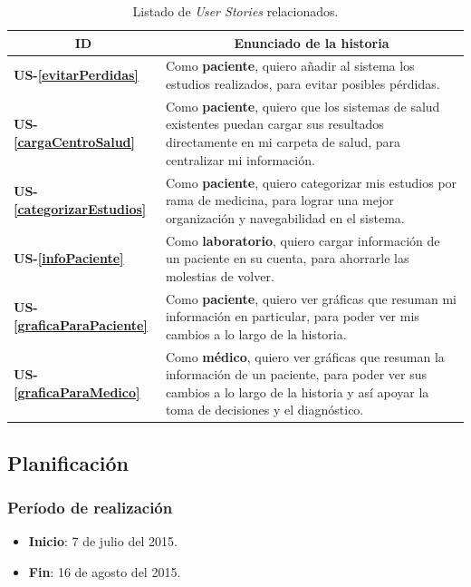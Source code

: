 \begin{table}[h]
    \centering
	\begin{tabular}{|m{1.5cm}|m{11.5cm}|}
	\hline
        \multicolumn{1}{|c|}{\textbf{ID}} &
        \multicolumn{1}{c|}{\textbf{Enunciado de la historia}} \\          
    \hline
        \textbf{US-\ref{evitarPerdidas}} & Como \textbf{paciente}, quiero añadir al sistema los estudios realizados, para evitar posibles pérdidas.\\
     \hline 
        \textbf{US-\ref{cargaCentroSalud}} & Como \textbf{paciente}, quiero que los sistemas de salud existentes puedan cargar sus resultados directamente en mi carpeta de salud, para centralizar mi información. \\
      \hline 
        \textbf{US-\ref{categorizarEstudios}} & Como \textbf{paciente}, quiero categorizar mis estudios por rama de medicina, para lograr una mejor organización y navegabilidad en el sistema. \\
       \hline 
        \textbf{US-\ref{infoPaciente}} & Como \textbf{laboratorio}, quiero cargar información de un paciente en su cuenta, para ahorrarle las molestias de volver. \\
    \hline 
	    \textbf{US-\ref{graficaParaPaciente}} & Como \textbf{paciente}, quiero ver gráficas que resuman mi información en particular, para poder ver mis cambios a lo largo de la historia.\\
    \hline        
        \textbf{US-\ref{graficaParaMedico}} & Como \textbf{médico}, quiero ver gráficas que resuman la información de un paciente, para poder ver sus cambios a lo largo de la historia y así apoyar la toma de decisiones y el diagnóstico.\\
    \hline
    \end{tabular}
    \caption{Listado de \textit{User Stories} relacionados.}
    \label{US-Sprint3}
\end{table}


\subsection{Planificación}

\subsubsection{Período de realización}
\begin{itemize}
    \item \textbf{Inicio}: 7 de julio del 2015.
    \item \textbf{Fin}: 16 de agosto del 2015.
\end{itemize}

